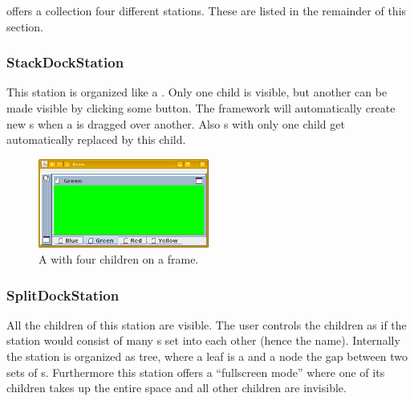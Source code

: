  offers a collection four different stations. These are listed in the remainder of this section.

\subsubsection{StackDockStation}
This station is organized like a . Only one child is visible, but another can be made visible by clicking some button. The framework will automatically create new s when a  is dragged over another. Also s with only one child get automatically replaced by this child.

\begin{figure}[h!]
  \centering
    \includegraphics[width=0.5\textwidth]{basics/StackDockStation}
  \caption{A  with four children on a frame.}
\end{figure}


\subsubsection{SplitDockStation}
All the children of this station are visible. The user controls the children as if the station would consist of many s set into each other (hence the name). Internally the station is organized as tree, where a leaf is a  and a node the gap between two sets of s. Furthermore this station offers a ``fullscreen mode'' where one of its children takes up the entire space and all other children are invisible.

